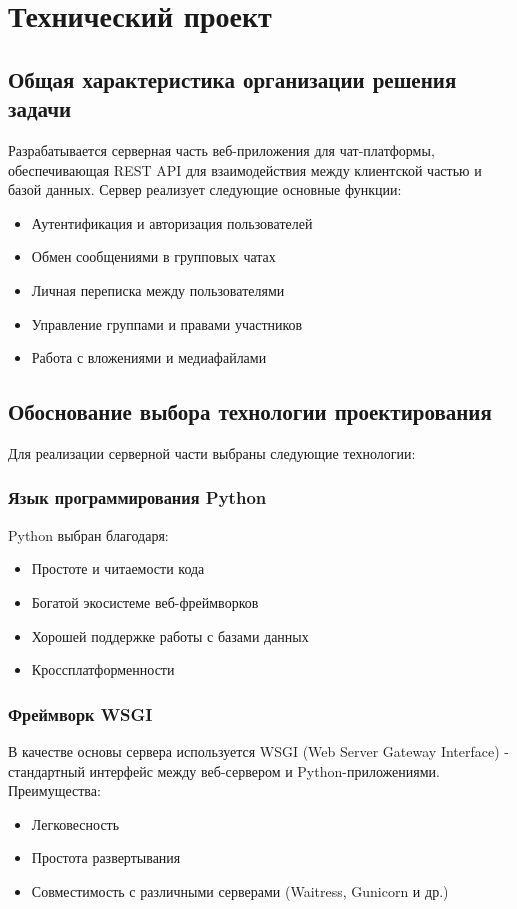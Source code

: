 \section{Технический проект}
\subsection{Общая характеристика организации решения задачи}

Разрабатывается серверная часть веб-приложения для чат-платформы, обеспечивающая REST API для взаимодействия между клиентской частью и базой данных. Сервер реализует следующие основные функции:
\begin{itemize}
	\item Аутентификация и авторизация пользователей
	\item Обмен сообщениями в групповых чатах
	\item Личная переписка между пользователями
	\item Управление группами и правами участников
	\item Работа с вложениями и медиафайлами
\end{itemize}

\subsection{Обоснование выбора технологии проектирования}

Для реализации серверной части выбраны следующие технологии:

\subsubsection{Язык программирования Python}

Python выбран благодаря:
\begin{itemize}
	\item Простоте и читаемости кода
	\item Богатой экосистеме веб-фреймворков
	\item Хорошей поддержке работы с базами данных
	\item Кроссплатформенности
\end{itemize}

\subsubsection{Фреймворк WSGI}

В качестве основы сервера используется WSGI (Web Server Gateway Interface) - стандартный интерфейс между веб-сервером и Python-приложениями. Преимущества:
\begin{itemize}
	\item Легковесность
	\item Простота развертывания
	\item Совместимость с различными серверами (Waitress, Gunicorn и др.)
\end{itemize}

